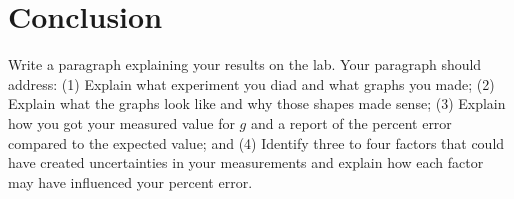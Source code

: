 \documentclass[10pt]{exam}
\begin{document}
\pagebreak

\section*{Conclusion}

Write a paragraph explaining your results on the lab.  Your paragraph should address: (1) Explain what experiment you diad and what graphs you made; (2) Explain what the graphs look like and why those shapes made sense; (3) Explain how you got your measured value for $g$ and a report of the percent error compared to the expected value; and (4) Identify three to four factors that could have created uncertainties in your measurements and explain how each factor may have influenced your percent error.
\end{document}
